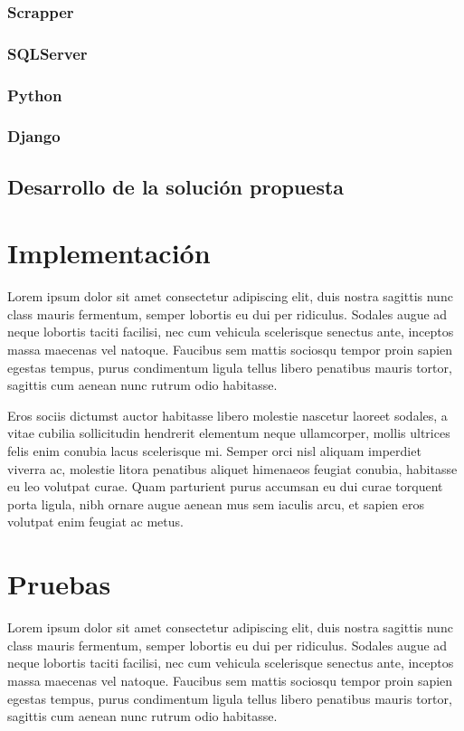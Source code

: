 \documentclass{article}
\begin{document}
\subsubsection{Scrapper}
\subsubsection{SQLServer}
\subsubsection{Python}
\subsubsection{Django}

\subsection{Desarrollo de la solución propuesta}
\newpage

\section{Implementación}
Lorem ipsum dolor sit amet consectetur adipiscing elit, duis nostra sagittis nunc class mauris fermentum, semper lobortis eu dui per ridiculus. Sodales augue ad neque lobortis taciti facilisi, nec cum vehicula scelerisque senectus ante, inceptos massa maecenas vel natoque. Faucibus sem mattis sociosqu tempor proin sapien egestas tempus, purus condimentum ligula tellus libero penatibus mauris tortor, sagittis cum aenean nunc rutrum odio habitasse.

Eros sociis dictumst auctor habitasse libero molestie nascetur laoreet sodales, a vitae cubilia sollicitudin hendrerit elementum neque ullamcorper, mollis ultrices felis enim conubia lacus scelerisque mi. Semper orci nisl aliquam imperdiet viverra ac, molestie litora penatibus aliquet himenaeos feugiat conubia, habitasse eu leo volutpat curae. Quam parturient purus accumsan eu dui curae torquent porta ligula, nibh ornare augue aenean mus sem iaculis arcu, et sapien eros volutpat enim feugiat ac metus.
\newpage

\section{Pruebas}
Lorem ipsum dolor sit amet consectetur adipiscing elit, duis nostra sagittis nunc class mauris fermentum, semper lobortis eu dui per ridiculus. Sodales augue ad neque lobortis taciti facilisi, nec cum vehicula scelerisque senectus ante, inceptos massa maecenas vel natoque. Faucibus sem mattis sociosqu tempor proin sapien egestas tempus, purus condimentum ligula tellus libero penatibus mauris tortor, sagittis cum aenean nunc rutrum odio habitasse.
\end{document}
